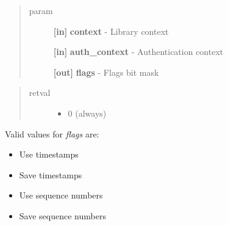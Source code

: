 \documentclass[letterpaper,10pt,english]{sphinxmanual}
\begin{document}
\begin{fulllineitems}
\label{appdev/refs/api/krb5_auth_con_getflags:krb5_auth_con_getflags}
\end{fulllineitems}

\begin{quote}\begin{description}
\item[{param}] \leavevmode
\textbf{{[}in{]}} \textbf{context} - Library context

\textbf{{[}in{]}} \textbf{auth\_context} - Authentication context

\textbf{{[}out{]}} \textbf{flags} - Flags bit mask

\end{description}\end{quote}
\begin{quote}\begin{description}
\item[{retval}] \leavevmode\begin{itemize}
\item {} 
0   (always)

\end{itemize}

\end{description}\end{quote}

Valid values for \emph{flags} are:
\begin{itemize}
\item {} 
{\hyperref[appdev/refs/macros/KRB5_AUTH_CONTEXT_DO_TIME:KRB5_AUTH_CONTEXT_DO_TIME]{}} Use timestamps

\item {} 
{\hyperref[appdev/refs/macros/KRB5_AUTH_CONTEXT_RET_TIME:KRB5_AUTH_CONTEXT_RET_TIME]{}} Save timestamps

\item {} 
{\hyperref[appdev/refs/macros/KRB5_AUTH_CONTEXT_DO_SEQUENCE:KRB5_AUTH_CONTEXT_DO_SEQUENCE]{}} Use sequence numbers

\item {} 
{\hyperref[appdev/refs/macros/KRB5_AUTH_CONTEXT_RET_SEQUENCE:KRB5_AUTH_CONTEXT_RET_SEQUENCE]{}} Save sequence numbers

\end{itemize}
\end{document}
